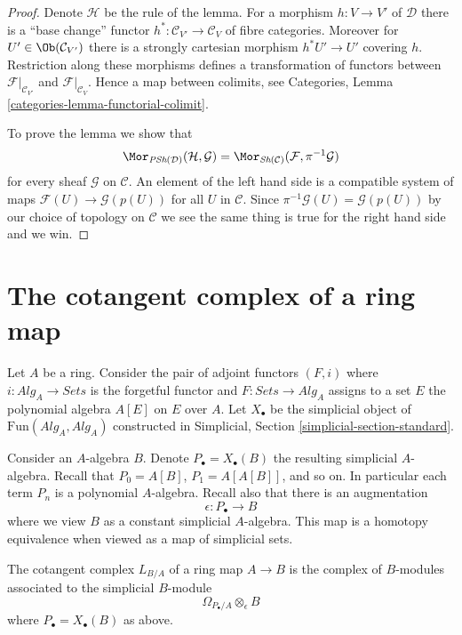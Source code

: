 \begin{proof}
Denote $\mathcal{H}$ be the rule of the lemma.
For a morphism $h : V \to V'$ of $\mathcal{D}$ there is a
``base change'' functor
$h^* : \mathcal{C}_{V'} \to \mathcal{C}_V$ of fibre categories.
Moreover for $U' \in \Ob(\mathcal{C}_{V'})$ there is a
strongly cartesian morphism $h^*U' \to U'$ covering $h$.
Restriction along these morphisms defines a transformation
of functors between $\mathcal{F}|_{\mathcal{C}_{V'}}$ and
$\mathcal{F}|_{\mathcal{C}_V}$. Hence a map between colimits, see
Categories, Lemma \ref{categories-lemma-functorial-colimit}.

\medskip\noindent
To prove the lemma we show that
$$
\Mor_{\textit{PSh}(\mathcal{D})}(\mathcal{H}, \mathcal{G}) =
\Mor_{\textit{Sh}(\mathcal{C})}(\mathcal{F}, \pi^{-1}\mathcal{G})
$$
for every sheaf $\mathcal{G}$ on $\mathcal{C}$. An element of the
left hand side is a compatible system of maps
$\mathcal{F}(U) \to \mathcal{G}(p(U))$ for all $U$ in $\mathcal{C}$.
Since $\pi^{-1}\mathcal{G}(U) = \mathcal{G}(p(U))$ by our choice
of topology on $\mathcal{C}$ we see the same thing is true for the
right hand side and we win.
\end{proof}



\section{The cotangent complex of a ring map}
\label{section-cotangent-ring-map}

\noindent
Let $A$ be a ring. Consider the pair of adjoint functors
$(F, i)$ where $i : \textit{Alg}_A \to \textit{Sets}$
is the forgetful functor and $F : \textit{Sets} \to \textit{Alg}_A$
assigns to a set $E$ the polynomial algebra $A[E]$ on $E$ over $A$.
Let $X_\bullet$ be the simplicial object of
$\text{Fun}(\textit{Alg}_A, \textit{Alg}_A)$ constructed in
Simplicial, Section \ref{simplicial-section-standard}.

\medskip\noindent
Consider an $A$-algebra $B$. Denote $P_\bullet = X_\bullet(B)$ the resulting
simplicial $A$-algebra. Recall that $P_0 = A[B]$, $P_1 = A[A[B]]$, and so on.
In particular each term $P_n$ is a polynomial $A$-algebra.
Recall also that there is an augmentation
$$
\epsilon : P_\bullet \longrightarrow B
$$
where we view $B$ as a constant simplicial $A$-algebra.
This map is a homotopy equivalence when viewed as a map of simplicial sets.

\begin{definition}
\label{definition-cotangent-complex-ring-map}
The cotangent complex $L_{B/A}$ of a ring map $A \to B$ is the complex of
$B$-modules associated to the simplicial $B$-module
$$
\Omega_{P_\bullet/A} \otimes_\epsilon B
$$
where $P_\bullet = X_\bullet(B)$ as above.
\end{definition}

